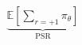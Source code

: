 \documentclass[preview]{standalone}
\begin{document}
\begin{align*}
\underbrace{\mathbb{E}\!\left[\sum_{r=+1}\pi_\theta\right]}_{\text{PSR}}
\end{align*}
\end{document}
